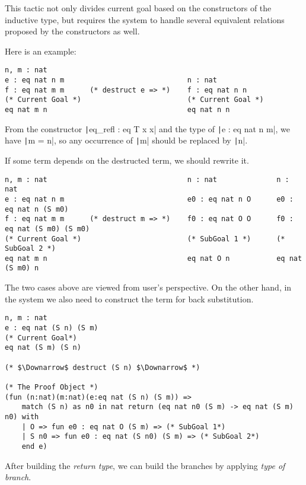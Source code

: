 This tactic not only divides current goal based on the constructors of the inductive
type, but requires the system to handle several equivalent relations proposed by the constructors as well.\par
Here is an example:
\begin{center}
\begin{minipage}{0.7\textwidth}
\begin{verbatim}
n, m : nat                                                      
e : eq nat n m                             n : nat  
f : eq nat m m      (* destruct e => *)    f : eq nat n n    
(* Current Goal *)                         (* Current Goal *)
eq nat m n                                 eq nat n n       
\end{verbatim}
\end{minipage}
\end{center}
From the constructor \texttt|eq_refl : eq T x x| and the type of \texttt|e : eq nat n m|,
we have \texttt|m = n|, so any occurrence of \texttt|m| should be replaced by \texttt|n|.\par
If some term depends on the destructed term, we should rewrite it.
\begin{center}
\begin{verbatim}
n, m : nat                                 n : nat              n : nat                  
e : eq nat n m                             e0 : eq nat n O      e0 : eq nat n (S m0) 
f : eq nat m m      (* destruct m => *)    f0 : eq nat O O      f0 : eq nat (S m0) (S m0) 
(* Current Goal *)                         (* SubGoal 1 *)      (* SubGoal 2 *)
eq nat m n                                 eq nat O n           eq nat (S m0) n     
\end{verbatim}
\end{center}
The two cases above are viewed from user's perspective.
On the other hand, in the system we also need to construct the term for back substitution.
\begin{center}
\begin{minipage}{\textwidth}
\begin{verbatim}
n, m : nat                                     
e : eq nat (S n) (S m)  
(* Current Goal*)                              
eq nat (S m) (S n)                             

(* $\Downarrow$ destruct (S n) $\Downarrow$ *)   

(* The Proof Object *)
(fun (n:nat)(m:nat)(e:eq nat (S n) (S m)) =>                                                                                
    match (S n) as n0 in nat return (eq nat n0 (S m) -> eq nat (S m) n0) with 
    | O => fun e0 : eq nat O (S m) => (* SubGoal 1*)                          
    | S n0 => fun e0 : eq nat (S n0) (S m) => (* SubGoal 2*)                  
    end e)                                                  
\end{verbatim}
\end{minipage}
\end{center}
After building the {\it return type}, we can build the branches by applying {\it type of branch}.

